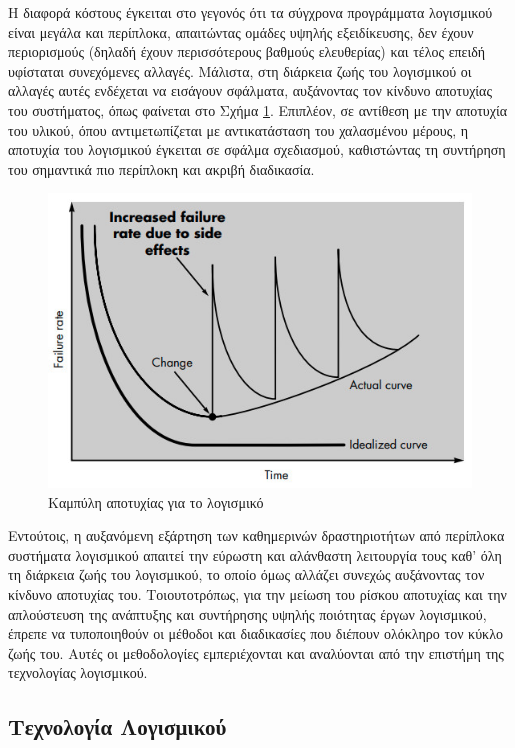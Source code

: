 \documentclass{report}
\begin{document}
Η διαφορά κόστους έγκειται στο γεγονός ότι τα σύγχρονα προγράμματα λογισμικού είναι μεγάλα και περίπλοκα, απαιτώντας ομάδες υψηλής εξειδίκευσης, δεν έχουν περιορισμούς (δηλαδή έχουν περισσότερους βαθμούς ελευθερίας) και τέλος επειδή υφίσταται συνεχόμενες αλλαγές. Μάλιστα, στη διάρκεια ζωής του λογισμικού οι αλλαγές αυτές ενδέχεται να εισάγουν σφάλματα, αυξάνοντας τον κίνδυνο αποτυχίας του συστήματος, όπως φαίνεται στο Σχήμα \ref{fig:software_failure_rate}. Επιπλέον, σε αντίθεση με την αποτυχία του υλικού, όπου αντιμετωπίζεται με αντικατάσταση του χαλασμένου μέρους, η αποτυχία του λογισμικού έγκειται σε σφάλμα σχεδιασμού, καθιστώντας τη συντήρηση του σημαντικά πιο περίπλοκη και ακριβή διαδικασία.

\begin{figure}[h]
    \centering
    \includegraphics[scale=2.2]{images/software_engineering/software_failure_rate.jpg}
    \caption{Καμπύλη αποτυχίας για το λογισμικό}
    \label{fig:software_failure_rate}
\end{figure}

Εντούτοις, η αυξανόμενη εξάρτηση των καθημερινών δραστηριοτήτων από περίπλοκα συστήματα λογισμικού απαιτεί την εύρωστη και αλάνθαστη λειτουργία τους καθ' όλη τη διάρκεια ζωής του λογισμικού, το οποίο όμως αλλάζει συνεχώς αυξάνοντας τον κίνδυνο αποτυχίας του. Τοιουτοτρόπως, για την μείωση του ρίσκου αποτυχίας και την απλούστευση της ανάπτυξης και συντήρησης υψηλής ποιότητας έργων λογισμικού, έπρεπε να τυποποιηθούν οι μέθοδοι και διαδικασίες που διέπουν ολόκληρο τον κύκλο ζωής του. Αυτές οι μεθοδολογίες εμπεριέχονται και αναλύονται από την επιστήμη της τεχνολογίας λογισμικού.

\subsection{Τεχνολογία Λογισμικού}
\end{document}

